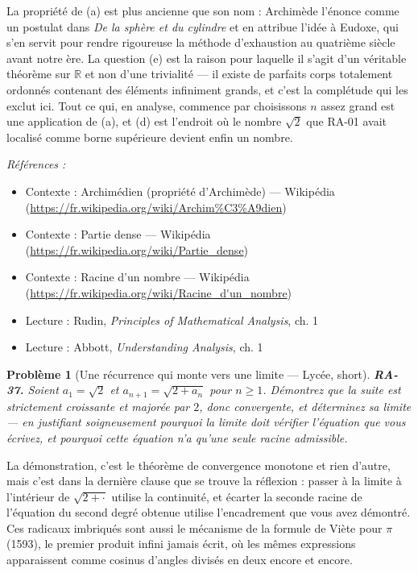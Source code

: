 \documentclass[11pt]{article}
\newtheorem{problem}{Problème}
\newenvironment{refs}{\par\small\noindent\emph{Références :}\begin{itemize}\setlength\itemsep{0pt}}{\end{itemize}\normalsize}
\begin{document}
\noindent La propriété de (a) est plus ancienne que son nom : Archimède l'énonce comme un
postulat dans \textit{De la sphère et du cylindre} et en attribue l'idée à Eudoxe, qui s'en servit pour
rendre rigoureuse la méthode d'exhaustion au quatrième siècle avant notre ère. La question (e) est la
raison pour laquelle il s'agit d'un véritable théorème sur $ \mathbb{R} $ et non d'une trivialité ---
il existe de parfaits corps totalement ordonnés contenant des éléments infiniment grands, et c'est la
complétude qui les exclut ici. Tout ce qui, en analyse, commence par \og{} choisissons $ n $ assez
grand \fg{} est une application de (a), et (d) est l'endroit où le nombre $ \sqrt{2} $ que RA-01 avait
localisé comme borne supérieure devient enfin un nombre.

\begin{refs}
\item Contexte : Archimédien (propriété d'Archimède) --- Wikipédia (\url{https://fr.wikipedia.org/wiki/Archim%C3%A9dien})
\item Contexte : Partie dense --- Wikipédia (\url{https://fr.wikipedia.org/wiki/Partie_dense})
\item Contexte : Racine d'un nombre --- Wikipédia (\url{https://fr.wikipedia.org/wiki/Racine_d'un_nombre})
\item Lecture : Rudin, \textit{Principles of Mathematical Analysis}, ch. 1
\item Lecture : Abbott, \textit{Understanding Analysis}, ch. 1
\end{refs}

\bigskip

\begin{problem}[{Une récurrence qui monte vers une limite --- Lycée, short}]
\textbf{RA-37.} Soient $ a_1 = \sqrt{2} $ et $ a_{n+1} = \sqrt{2 + a_n} $
pour $ n \ge 1 $. Démontrez que la suite est strictement croissante et majorée par $ 2 $, donc
convergente, et déterminez sa limite --- en justifiant soigneusement pourquoi la limite doit vérifier
l'équation que vous écrivez, et pourquoi cette équation n'a qu'une seule racine admissible.
\end{problem}

\noindent La démonstration, c'est le théorème de convergence monotone et rien d'autre, mais
c'est dans la dernière clause que se trouve la réflexion : passer à la limite à l'intérieur de
$ \sqrt{2+\cdot} $ utilise la continuité, et écarter la seconde racine de l'équation du second
degré obtenue utilise l'encadrement que vous avez démontré. Ces radicaux imbriqués sont aussi le
mécanisme de la formule de Viète pour $\pi$ (1593), le premier produit infini jamais écrit, où les mêmes
expressions apparaissent comme cosinus d'angles divisés en deux encore et encore.
\end{document}
